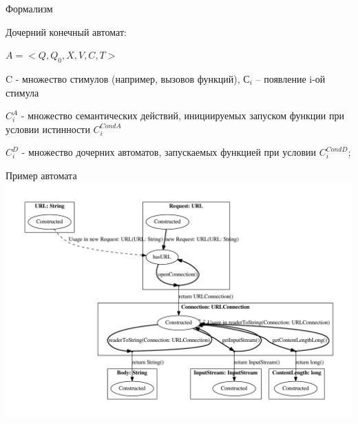 \documentclass[12pt]{beamer}
\begin{document}
{
\begin{frame}[fragile]{Формализм}
  \begin{mybox}[]
  Дочерний конечный автомат:
  
	$A = <Q, Q_0, X, V, C, T>$
	
	C - множество стимулов (например, вызовов функций), $С_i$ – появление i-ой стимула
	
	$C_i^A$ - множество семантических действий, инициируемых запуском функции при условии истинности $C_i^{CondA}$
	
	$C_i^D$ - множество дочерних автоматов, запускаемых функцией при условии $C_i^{CondD}$;
  \end{mybox}
\end{frame}
}


\begin{frame}{Пример автомата}
	\includegraphics[width=\textwidth]{java.pdf}
\end{frame}
\end{document}
